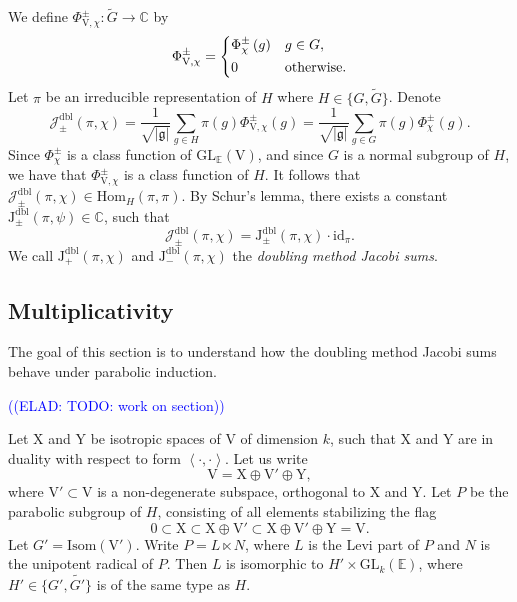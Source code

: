 \documentclass[12pt, reqno]{amsart}
\theoremstyle{definition}
\theoremstyle{definition}
\theoremstyle{definition}
\newcommand{\cComplex}{\mathbb{C}}
\newcommand{\Hom}{\mathrm{Hom}}
\newcommand{\idmap}{\mathrm{id}}
\newcommand{\sizeof}[1]{\left|#1\right|}
\newcommand{\hermitianSpace}{\mathrm{V}}
\newcommand{\xIsotropic}{\mathrm{X}}
\newcommand{\yIsotropic}{\mathrm{Y}}
\newcommand{\innerproduct}[2]{\left\langle #1,#2\right\rangle}
\newcommand{\fieldCharacter}{\psi}
\newcommand{\GL}{\mathrm{GL}}
\newcommand{\GroupExtension}[1]{\widetilde{#1}}
\newcommand{\quadraticExtension}{\mathbb{E}}
\newcommand{\dblJacobiSum}[2]{\mathcal{J}_{\pm}^{\mathrm{dbl}}\left(#1, #2\right)}
\newcommand{\genJacobiKernel}[1]{\Phi^{\pm}_{#1}}
\newcommand{\genHermitianJacobiKernel}[2]{\Phi^{\pm}_{#1,#2}}
\newcommand{\dblJacobiSumScalar}[2]{\mathrm{J}_{\pm}^{\mathrm{dbl}}\left(#1, #2\right)}
\newcommand{\posDblJacobiSumScalar}[2]{\mathrm{J}_{+}^{\mathrm{dbl}}\left(#1, #2\right)}
\newcommand{\negDblJacobiSumScalar}[2]{\mathrm{J}_{-}^{\mathrm{dbl}}\left(#1, #2\right)}
\newcommand{\IsometryGroup}{\mathrm{Isom}}
\newcommand{\lieAlgebra}{\mathfrak{g}}
\newcommand{\elad}[1]{\textcolor{blue}{\sffamily ((ELAD: #1))}}
\begin{document}
We define $\genHermitianJacobiKernel{\hermitianSpace}{\chi} \colon \tilde{G} \to \cComplex$ by $$\genHermitianJacobiKernel{\hermitianSpace}{\chi} =
	\begin{dcases}
		\genJacobiKernel{\chi}\left(g\right) & g \in G,\\
		0 & \text{otherwise.}
	\end{dcases}$$
Let $\pi$ be an irreducible representation of $H$ where $H \in \{G, \GroupExtension{G}\}$. Denote $$\dblJacobiSum{\pi}{\chi} = \frac{1}{\sqrt{\sizeof{\lieAlgebra}}} \sum_{g \in H} \pi\left(g\right) \genHermitianJacobiKernel{\hermitianSpace}{\chi}\left(g\right) = \frac{1}{\sqrt{\sizeof{\lieAlgebra}}} \sum_{g \in G} \pi\left(g\right) \genJacobiKernel{\chi}\left(g\right).$$
Since $\genJacobiKernel{\chi}$ is a class function of $\GL_{\quadraticExtension}\left(\hermitianSpace\right)$, and since $G$ is a normal subgroup of $H$, we have that $\genHermitianJacobiKernel{\hermitianSpace}{\chi}$ is a class function of $H$. It follows that $\dblJacobiSum{\pi}{\chi} \in \Hom_{H}\left(\pi, \pi\right)$. By Schur's lemma, there exists a constant $\dblJacobiSumScalar{\pi}{\fieldCharacter} \in \cComplex$, such that $$\dblJacobiSum{\pi}{\chi} = \dblJacobiSumScalar{\pi}{\chi} \cdot \idmap_\pi.$$
We call $\posDblJacobiSumScalar{\pi}{\chi}$ and $\negDblJacobiSumScalar{\pi}{\chi}$ the \emph{doubling method Jacobi sums}.

\subsection{Multiplicativity}\label{subsec:multiplicativity}
The goal of this section is to understand how the doubling method Jacobi sums behave under parabolic induction.

\elad{TODO: work on section}

Let $\xIsotropic$ and $\yIsotropic$ be isotropic spaces of $\hermitianSpace$ of dimension $k$, such that $\xIsotropic$ and $\yIsotropic$ are in duality with respect to form $\innerproduct{\cdot}{\cdot}$. Let us write $$\hermitianSpace = \xIsotropic \oplus \hermitianSpace' \oplus \yIsotropic,$$
where $\hermitianSpace' \subset \hermitianSpace$ is a non-degenerate subspace, orthogonal to $\xIsotropic$ and $\yIsotropic$. Let $P$ be the parabolic subgroup of $H$, consisting of all elements stabilizing the flag $$0 \subset \xIsotropic \subset \xIsotropic \oplus \hermitianSpace' \subset \xIsotropic \oplus \hermitianSpace' \oplus \yIsotropic = \hermitianSpace.$$
Let $G' = \IsometryGroup\left(\hermitianSpace'\right)$. Write $P = L \ltimes N$, where $L$ is the Levi part of $P$ and $N$ is the unipotent radical of $P$. Then $L$ is isomorphic to $H' \times \GL_k\left(\quadraticExtension\right)$, where $H' \in \{G',\GroupExtension{G'}\}$ is of the same type as $H$. 
\end{document}
